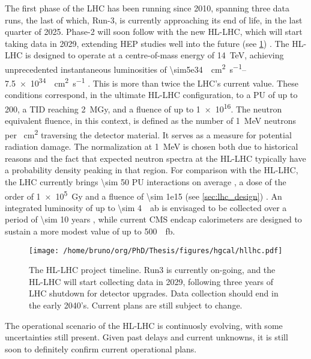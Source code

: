 \documentclass[11pt]{article}
\newcommand{\run}[1]{Run-#1}
\begin{document}
The first phase of the \ac{LHC} has been running since 2010, spanning three data runs, the last of which, \run{3}, is currently approaching its end of life, in the last quarter of 2025.
Phase-2 will soon follow with the new \ac{HL-LHC}, which will start taking data in 2029, extending \ac{HEP} studies well into the future (see \cref{fig:hllhc}) \cite{hllhc_evolution_paper1,hllhc_evolution_paper2}.
The \ac{HL-LHC} is designed to operate at a centre-of-mass energy of \SI{14}{\TeV}, achieving unprecedented instantaneous luminosities of \SIrange{\sim5e34}{7.5e34}{\per\cm\squared\per\second} \cite{hllhc}.
This is more than twice the \ac{LHC}’s current value.
These conditions correspond, in the ultimate HL-LHC configuration, to a \ac{PU} of up to 200, a \ac{TID} reaching \SI{2}{\mega\gray}, and a fluence of up to \SI{1e16}{\nequiv}.
The neutron equivalent fluence, in this context, is defined as the number of \SI{1}{\MeV} neutrons per \si{\per\cm\squared} traversing the detector material.
It serves as a measure for potential radiation damage.
The normalization at \SI{1}{\MeV} is chosen both due to historical reasons and the fact that expected neutron spectra at the \ac{HL-LHC} typically have a probability density peaking in that region. 
For comparison with the \ac{HL-LHC}, the \ac{LHC} currently brings \num{\sim 50} \ac{PU} interactions on average \cite{pileup_twiki}, a dose of the order of \SI{1e5}{\gray} and a fluence of \SI{\sim 1e15}{\nequiv} (see \cref{sec:lhc_design}) \cite{lhc_fluences}.
An integrated luminosity of up to \SI{\sim 4}{\per\atto\barn} is envisaged to be collected over a period of \num{\sim 10} years \cite{hllhc}, while current \ac{CMS} endcap calorimeters are designed to sustain a more modest value of up to \SI{500}{\per\femto\barn}.

\begin{figure}[htbp]
\centering
\texttt{[image: /home/bruno/org/PhD/Thesis/figures/hgcal/hllhc.pdf]}
\caption{\label{fig:hllhc}The \ac{HL-LHC} project timeline. Run3 is currently on-going, and the \ac{HL-LHC} will start collecting data in 2029, following three years of \ac{LHC} shutdown for detector upgrades. Data collection should end in the early 2040's. Current plans are still subject to change.}
\end{figure}

The operational scenario of the \ac{HL-LHC} is continuosly evolving, with some uncertainties still present.
Given past delays and current unknowns, it is still soon to definitely confirm current operational plans.
\end{document}
